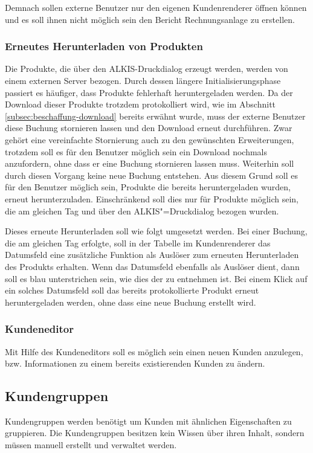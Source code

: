 Demnach sollen externe Benutzer nur den eigenen Kundenrenderer öffnen können und es soll ihnen nicht möglich sein den Bericht Rechnungsanlage zu erstellen.

\subsubsection{Erneutes Herunterladen von Produkten}
Die Produkte, die über den ALKIS-Druckdialog erzeugt werden, werden von einem externen Server bezogen.
Durch dessen längere Initialisierungsphase passiert es häufiger, dass Produkte fehlerhaft heruntergeladen werden.
Da der Download dieser Produkte trotzdem protokolliert wird, wie im Abschnitt \vref{subsec:beschaffung-download} bereits erwähnt wurde, muss der externe Benutzer diese Buchung stornieren lassen und den Download erneut durchführen.
Zwar gehört eine vereinfachte Stornierung auch zu den gewünschten Erweiterungen, trotzdem soll es für den Benutzer möglich sein ein Download nochmals anzufordern, ohne dass er eine Buchung stornieren lassen muss.
Weiterhin soll durch diesen Vorgang keine neue Buchung entstehen.
Aus diesem Grund soll es für den Benutzer möglich sein, Produkte die bereits heruntergeladen wurden, erneut herunterzuladen. Einschränkend soll dies nur für Produkte möglich sein, die am gleichen Tag und über den ALKIS"=Druckdialog bezogen wurden. 

Dieses erneute Herunterladen soll wie folgt umgesetzt werden. Bei einer Buchung, die am gleichen Tag erfolgte, soll in der Tabelle im Kundenrenderer das Datumsfeld eine zusätzliche Funktion als Auslöser zum erneuten Herunterladen des Produkts erhalten.
Wenn das Datumsfeld ebenfalls als Auslöser dient, dann soll es blau unterstrichen sein, wie dies der  zu entnehmen ist.
Bei einem Klick auf ein solches Datumsfeld soll das bereits protokollierte Produkt erneut heruntergeladen werden, ohne dass eine neue Buchung erstellt wird.

\subsubsection{Kundeneditor}
Mit Hilfe des Kundeneditors soll es möglich sein einen neuen Kunden anzulegen, bzw. Informationen zu einem bereits existierenden Kunden zu ändern.

\subsection{Kundengruppen}
Kundengruppen werden benötigt um Kunden mit ähnlichen Eigenschaften zu gruppieren.
Die Kundengruppen besitzen kein Wissen über ihren Inhalt, sondern müssen manuell erstellt und verwaltet werden.

